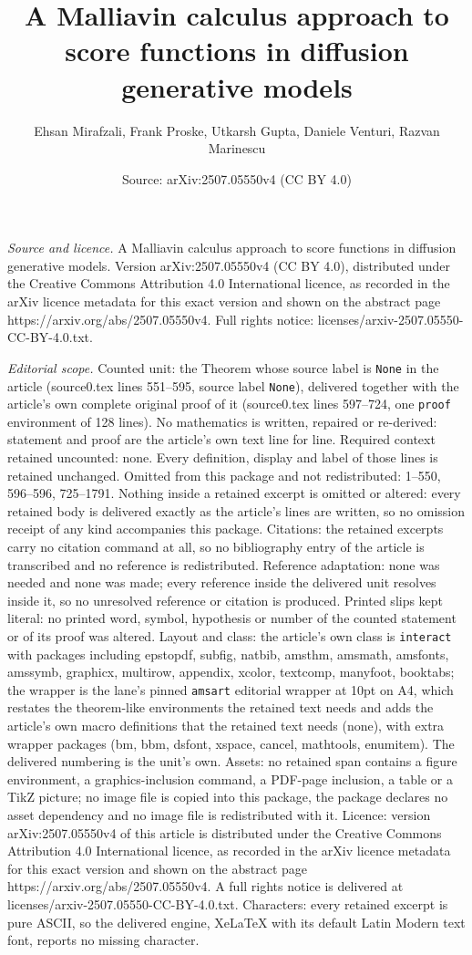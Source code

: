 \documentclass[10pt,a4paper]{amsart}
\title[A Malliavin calculus approach to score functions in diffusio]{A Malliavin calculus approach to score functions in diffusion generative models}
\author{Ehsan Mirafzali, Frank Proske, Utkarsh Gupta, Daniele Venturi, Razvan Marinescu}
\date{Source: arXiv:2507.05550v4 (CC BY 4.0)}
\begin{document}
\maketitle

\noindent\emph{Source and licence.} A Malliavin calculus approach to score functions in diffusion generative models. Version arXiv:2507.05550v4 (CC BY 4.0), distributed under the Creative Commons Attribution 4.0 International licence, as recorded in the arXiv licence metadata for this exact version and shown on the abstract page https://arxiv.org/abs/2507.05550v4. Full rights notice: licenses/arxiv-2507.05550-CC-BY-4.0.txt.\par\smallskip

\noindent\textit{Editorial scope.} Counted unit: the Theorem whose source label is \texttt{None} in the article (source0.tex lines 551--595, source label \texttt{None}), delivered together with the article's own complete original proof of it (source0.tex lines 597--724, one \texttt{proof} environment of 128 lines). No mathematics is written, repaired or re-derived: statement and proof are the article's own text line for line. Required context retained uncounted: none. Every definition, display and label of those lines is retained unchanged. Omitted from this package and not redistributed: 1--550, 596--596, 725--1791. Nothing inside a retained excerpt is omitted or altered: every retained body is delivered exactly as the article's lines are written, so no omission receipt of any kind accompanies this package. Citations: the retained excerpts carry no citation command at all, so no bibliography entry of the article is transcribed and no reference is redistributed. Reference adaptation: none was needed and none was made; every reference inside the delivered unit resolves inside it, so no unresolved reference or citation is produced. Printed slips kept literal: no printed word, symbol, hypothesis or number of the counted statement or of its proof was altered. Layout and class: the article's own class is \texttt{interact} with packages including epstopdf, subfig, natbib, amsthm, amsmath, amsfonts, amssymb, graphicx, multirow, appendix, xcolor, textcomp, manyfoot, booktabs; the wrapper is the lane's pinned \texttt{amsart} editorial wrapper at 10pt on A4, which restates the theorem-like environments the retained text needs and adds the article's own macro definitions that the retained text needs (none), with extra wrapper packages (bm, bbm, dsfont, xspace, cancel, mathtools, enumitem). The delivered numbering is the unit's own. Assets: no retained span contains a figure environment, a graphics-inclusion command, a PDF-page inclusion, a table or a TikZ picture; no image file is copied into this package, the package declares no asset dependency and no image file is redistributed with it. Licence: version arXiv:2507.05550v4 of this article is distributed under the Creative Commons Attribution 4.0 International licence, as recorded in the arXiv licence metadata for this exact version and shown on the abstract page https://arxiv.org/abs/2507.05550v4. A full rights notice is delivered at licenses/arxiv-2507.05550-CC-BY-4.0.txt. Characters: every retained excerpt is pure ASCII, so the delivered engine, XeLaTeX with its default Latin Modern text font, reports no missing character.
\end{document}
